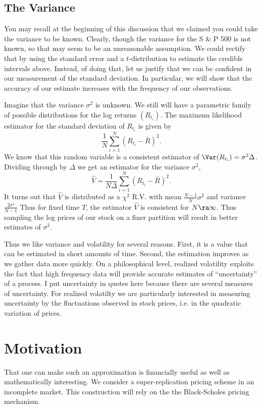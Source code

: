 \documentclass{report}
\begin{document}
\subsection{The Variance}

You may recall at the beginning of this discussion that we claimed you
could take the variance to be known.  Clearly, though the variance for
the S \& P 500 is not known, so that may seem to be an unreasonable
assumption.  We could rectify that by using the standard error and a
$t$-distribution to estimate the credible intervals above.  Instead,
of doing that, let us justify that we can be confident in our
measurement of the standard deviation.  In particular, we will show
that the accuracy of our estimate increases with the frequency of our
observations.  

Imagine that the variance $\sigma^2$ is unknown.  We still will have a
parametric family of possible distributions for the log returns
$(R_{t_i})$.  The maximum likelihood estimator for the standard
deviation of $R_{t_i}$ is given by
\[
\frac{1}{N} \sum_{i=1}^N (R_{t_i} - \bar R)^2.
\]
We know that this random variable is a consistent estimator of
$\Var(R_{t_i}) = \sigma^2 \Delta$.  Dividing through by $\Delta$ we
get an estimator for the variance $\sigma^2$,
\[
\hat V = \frac{1}{N \Delta} \sum_{i=1}^N(R_{t_i} - \bar R)^2.
\]
It turns out that $\hat V$ is distributed as a $\chi^2$ R.V. with mean
$\frac{N-1}{N} \sigma^2$ and variance $\frac{2 \sigma^4}{N-1}$  Thus
for fixed time $T$, the estimator $\hat V$ is consistent for $N \ra
\infty$.  Thus sampling the log prices of our stock on a finer
partition will result in better estimates of $\sigma^2$.

Thus we like variance and volatility for several reasons.  First, it
is a value that can be estimated in short amounts of time.  Second,
the estimation improves as we gather data more quickly.  On a
philosophical level, realized volatility exploits the fact that high
frequency data will provide accurate estimates of ``uncertainty'' of a
process.  I put uncertainty in quotes here because there are several
measures of uncertainty.  For realized volatilty we are particularly
interested in measuring uncertainty by the fluctuations observed in
stock prices, i.e. in the quadratic variation of prices.

\section{Motivation}

That one can make such an approximation is financially useful as well as
mathematically interesting.  We consider a super-replication pricing
scheme in an incomplete market.  This construction will rely on the
the Black-Scholes pricing mechanism.  
\end{document}
